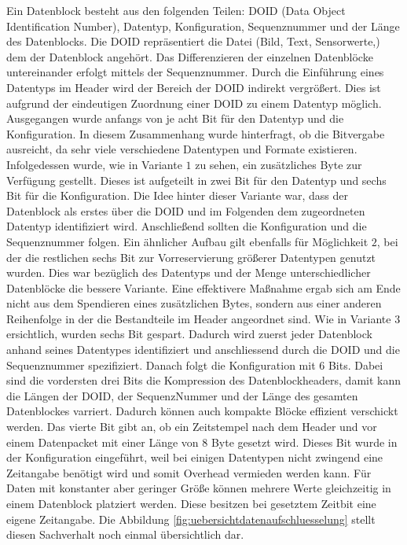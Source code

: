 Ein Datenblock besteht aus den folgenden Teilen: \gls{DOID} (Data Object
Identification Number), Datentyp, Konfiguration, Sequenznummer und der Länge des
Datenblocks. Die \gls{DOID} repräsentiert die Datei (Bild, Text, Sensorwerte,\etc)
dem der Datenblock angehört. Das Differenzieren der einzelnen Datenblöcke
untereinander erfolgt mittels der Sequenznummer. Durch die Einführung eines
Datentyps im Header wird der Bereich der \gls{DOID} indirekt vergrößert. Dies
ist aufgrund der eindeutigen Zuordnung einer \gls{DOID} zu einem Datentyp möglich.
\newline
Ausgegangen wurde anfangs von je acht Bit für den Datentyp und
die Konfiguration.
In diesem Zusammenhang wurde hinterfragt, ob die Bitvergabe ausreicht,
da sehr viele verschiedene Datentypen und Formate existieren. Infolgedessen
wurde, wie in Variante $1$ zu sehen, ein zusätzliches Byte zur Verfügung
gestellt. Dieses ist aufgeteilt in zwei Bit für den Datentyp und sechs Bit für
die Konfiguration. Die Idee hinter dieser Variante war, dass der Datenblock als
erstes über die \gls{DOID} und im Folgenden dem zugeordneten Datentyp identifiziert
wird. Anschließend sollten die Konfiguration und die Sequenznummer folgen.
Ein ähnlicher Aufbau gilt ebenfalls für Möglichkeit $2$, bei der die restlichen
sechs Bit zur Vorreservierung größerer Datentypen genutzt wurden. Dies war
bezüglich des Datentyps und der Menge unterschiedlicher Datenblöcke die bessere
Variante. Eine effektivere Maßnahme ergab sich am Ende nicht aus dem
Spendieren eines zusätzlichen Bytes, sondern aus einer anderen Reihenfolge in
der die Bestandteile im Header angeordnet sind. Wie in Variante $3$ ersichtlich,
wurden sechs Bit gespart. Dadurch wird zuerst jeder Datenblock anhand
seines Datentypes identifiziert und anschliessend durch die \gls{DOID} und die
Sequenznummer spezifiziert. Danach folgt die Konfiguration mit $6$ Bits.
Dabei sind die vordersten drei Bits die Kompression des Datenblockheaders, damit
kann die Längen der \gls{DOID}, der SequenzNummer und der Länge des gesamten
Datenblockes varriert. Dadurch können auch kompakte Blöcke effizient verschickt
werden.
Das vierte Bit gibt an, ob ein Zeitstempel nach dem Header und vor einem
Datenpacket mit einer Länge von $8$ Byte gesetzt wird.
Dieses Bit wurde in der Konfiguration eingeführt, weil bei einigen Datentypen
nicht zwingend eine Zeitangabe benötigt wird und somit Overhead vermieden
werden kann. Für Daten mit konstanter aber geringer Größe können mehrere Werte
gleichzeitig in einem Datenblock platziert werden. Diese besitzen bei
gesetztem Zeitbit eine eigene Zeitangabe. Die Abbildung
\ref{fig:uebersichtdatenaufschluesselung} stellt diesen Sachverhalt noch einmal
übersichtlich dar.

